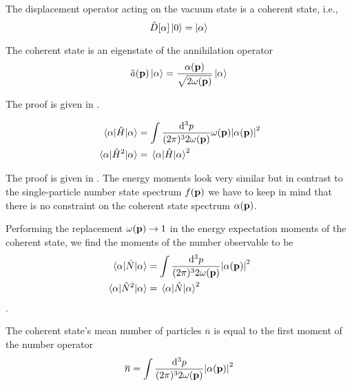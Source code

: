 \begin{lemma}
	The displacement operator acting on the vacuum state is a coherent state, i.e.,
	\begin{equation}
		\hat{D}[\alpha]
		\ket{0}
		=
		\ket{\alpha}
	\end{equation}
\end{lemma}
\begin{theorem}\label{thm:coherent_state_annihilation_eigenvalue}
	The coherent state is an eigenstate of the annihilation operator
	\begin{equation}
		\hat{a}(\vb{p})
		\ket{\alpha}
		=
		\frac{\alpha(\vb{p})}{\sqrt{2\omega(\vb{p})}}
		\ket{\alpha}
	\end{equation}
\end{theorem}
The proof is given in .

\begin{lemma}\label{thm:coherent_state_energy_observable}
	\begin{align}
		\expval{\hat{H}}{\alpha}
		&=
		\int\frac{\dd[3]{p}}{(2\pi)^32\omega(\vb{p})}
		\omega(\vb{p})
		\abs{\alpha(\vb{p})}^2
		\\
		\expval{\hat{H}^2}{\alpha}
		&=
		\expval{\hat{H}}{\alpha}^2
	\end{align}	
\end{lemma}
The proof is given in .
The energy moments look very similar but in contrast to the single-particle number state spectrum $f(\vb{p})$ we have to keep in mind that there is no constraint on the coherent state spectrum $\alpha(\vb{p})$.
\begin{corollary}
	Performing the replacement $\omega(\vb{p})\to1$ in the energy expectation moments of the coherent state, we find the moments of the number observable to be
	\begin{align}
		\expval{\hat{N}}{\alpha}
		&=
		\int\frac{\dd[3]{p}}{(2\pi)^32\omega(\vb{p})}
		\abs{\alpha(\vb{p})}^2
		\\
		\expval{\hat{N}^2}{\alpha}
		&=
		\expval{\hat{N}}{\alpha}^2
	\end{align}
	.
\end{corollary}
\begin{definition}
	The coherent state's mean number of particles $\overline{n}$ is equal to the first moment of the number operator
	\begin{equation}
		\overline{n}
		=
		\int\frac{\dd[3]{p}}{(2\pi)^32\omega(\vb{p})}
		\abs{\alpha(\vb{p})}^2
	\end{equation}
\end{definition}

